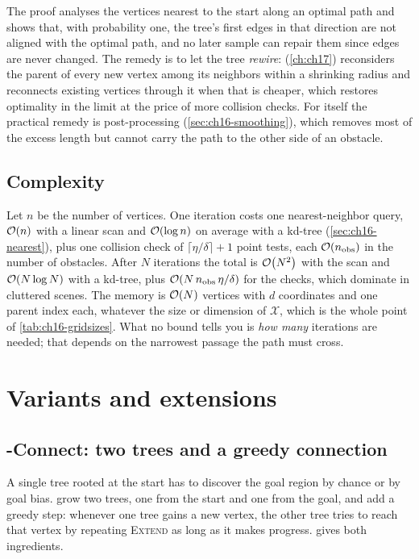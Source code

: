 The proof analyses the vertices nearest to the start along an optimal path
and shows that, with probability one, the tree's first edges in that
direction are not aligned with the optimal path, and no later sample can
repair them since edges are never changed. The remedy is to let the tree
\emph{rewire}: \rrtstar (\cref{ch:ch17}) reconsiders the parent of every new
vertex among its neighbors within a shrinking radius and reconnects existing
vertices through it when that is cheaper, which restores optimality in the
limit at the price of more collision checks. For \rrt itself the practical
remedy is post-processing (\cref{sec:ch16-smoothing}), which removes most of
the excess length but cannot carry the path to the other side of an obstacle.

\subsection{Complexity}
\label{sec:ch16-complexity}

Let $n$ be the number of vertices. One iteration costs one nearest-neighbor
query, $\mathcal{O}\!\left(n\right)$ with a linear scan and $\mathcal{O}\!\left(\log n\right)$ on average with a
kd-tree (\cref{sec:ch16-nearest}), plus one collision check of
$\lceil\eta/\delta\rceil+1$ point tests, each $\mathcal{O}\!\left(n_{\mathrm{obs}}\right)$ in
the number of obstacles. After $N$ iterations the total is $\mathcal{O}\!\left(N^{2}\right)$
with the scan and $\mathcal{O}\!\left(N\log N\right)$ with a kd-tree, plus
$\mathcal{O}\!\left(N\,n_{\mathrm{obs}}\,\eta/\delta\right)$ for the checks, which dominate in
cluttered scenes. The memory is $\mathcal{O}\!\left(N\right)$ vertices with $d$ coordinates and
one parent index each, whatever the size or dimension of $\mathcal{X}$,
which is the whole point of \cref{tab:ch16-gridsizes}. What no bound tells
you is \emph{how many} iterations are needed; that depends on the narrowest
passage the path must cross.

\section{Variants and extensions}
\label{sec:ch16-variants}

\subsection{\rrt-Connect: two trees and a greedy connection}
\label{sec:ch16-connect}

A single tree rooted at the start has to discover the goal region by chance
or by goal bias. \textcite{kuffner2000rrtconnect} grow two trees, one from
the start and one from the goal, and add a greedy step: whenever one tree
gains a new vertex, the other tree tries to reach that vertex by repeating
\textsc{Extend} as long as it makes progress.  gives
both ingredients.

